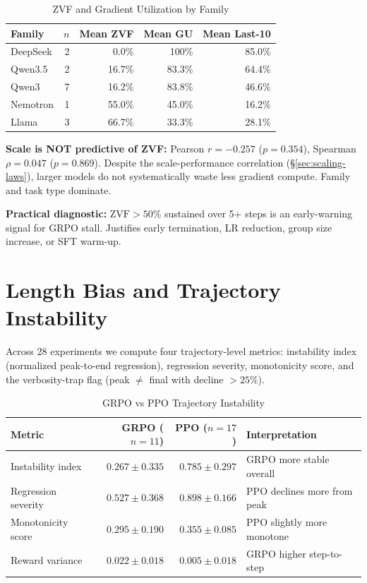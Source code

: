 \documentclass[12pt,a4paper]{report}
\theoremstyle{definition}
\begin{document}
\begin{table}[htbp]
\centering
\caption{ZVF and Gradient Utilization by Family}
\label{tab:zvf-family}
\begin{tabular}{lrrrr}
\toprule
\textbf{Family} & \textbf{$n$} & \textbf{Mean ZVF} & \textbf{Mean GU} & \textbf{Mean Last-10} \\
\midrule
DeepSeek     & 2 & 0.0\%  & 100\% & 85.0\% \\
Qwen3.5      & 2 & 16.7\% & 83.3\% & 64.4\% \\
Qwen3        & 7 & 16.2\% & 83.8\% & 46.6\% \\
Nemotron     & 1 & 55.0\% & 45.0\% & 16.2\% \\
Llama        & 3 & 66.7\% & 33.3\% & 28.1\% \\
\bottomrule
\end{tabular}
\end{table}

\textbf{Scale is NOT predictive of ZVF:} Pearson $r = -0.257$ ($p = 0.354$), Spearman $\rho = 0.047$
($p = 0.869$). Despite the scale-performance correlation (\S\ref{sec:scaling-laws}), larger models do
not systematically waste less gradient compute. Family and task type dominate.

\textbf{Practical diagnostic:} $\text{ZVF} > 50\%$ sustained over 5+ steps is an early-warning signal
for GRPO stall. Justifies early termination, LR reduction, group size increase, or SFT warm-up.

\section{Length Bias and Trajectory Instability}
\label{sec:length-bias}

Across 28 experiments we compute four trajectory-level metrics: instability index (normalized
peak-to-end regression), regression severity, monotonicity score, and the verbosity-trap flag
(peak $\ne$ final with decline $> 25\%$).

\begin{table}[htbp]
\centering
\caption{GRPO vs PPO Trajectory Instability}
\label{tab:trajectory-instability}
\begin{tabular}{lrrl}
\toprule
\textbf{Metric} & \textbf{GRPO ($n=11$)} & \textbf{PPO ($n=17$)} & \textbf{Interpretation} \\
\midrule
Instability index   & $0.267 \pm 0.335$ & $0.785 \pm 0.297$ & GRPO more stable overall \\
Regression severity & $0.527 \pm 0.368$ & $0.898 \pm 0.166$ & PPO declines more from peak \\
Monotonicity score  & $0.295 \pm 0.190$ & $0.355 \pm 0.085$ & PPO slightly more monotone \\
Reward variance     & $0.022 \pm 0.018$ & $0.005 \pm 0.018$ & GRPO higher step-to-step \\
\bottomrule
\end{tabular}
\end{table}
\end{document}
